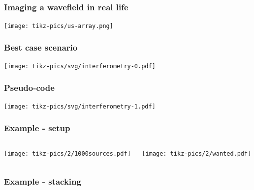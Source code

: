 \documentclass{beamer}
\begin{document}
\frame
{
\frametitle{{\bf Imaging a wavefield in real life}}
\centering
\texttt{[image: tikz-pics/us-array.png]}
\vfill
{}
}
\frame
{
\centering
\color{norange}{\bf method}
}
\frame
{
\frametitle{{\bf Best case scenario}}
\texttt{[image: tikz-pics/svg/interferometry-0.pdf]}
}
\frame
{
\frametitle{{\bf Pseudo-code}}
\texttt{[image: tikz-pics/svg/interferometry-1.pdf]}
}
\frame
{
\frametitle{{\bf Example - setup}}
\begin{columns}
\begin{column}{0.5\textwidth}
\texttt{[image: tikz-pics/2/1000sources.pdf]}
\end{column}
\begin{column}{0.5\textwidth}
\texttt{[image: tikz-pics/2/wanted.pdf]}
\end{column}
\end{columns}
}
\frame
{
\frametitle{{\bf Example - stacking}}
}
\end{document}
